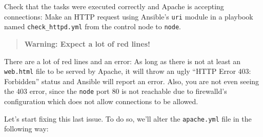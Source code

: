 Check that the tasks were executed correctly and Apache is accepting
connections: Make an HTTP request using Ansible's \texttt{uri} module in
a playbook named \texttt{check\_httpd.yml} from the control node to
\texttt{node}.

\begin{Shaded}
\begin{Highlighting}[]
\PreprocessorTok{{-}{-}{-}}
\KeywordTok{{-}}\AttributeTok{ }\KeywordTok{:}
\AttributeTok{  }\KeywordTok{:}
\AttributeTok{  }\KeywordTok{:}
\AttributeTok{    }\KeywordTok{:}\AttributeTok{ }
\AttributeTok{  }\KeywordTok{:}
\AttributeTok{    }\KeywordTok{{-}}\AttributeTok{ }\KeywordTok{:}
\AttributeTok{      }\KeywordTok{:}
\AttributeTok{        }\KeywordTok{:}\AttributeTok{ }
\end{Highlighting}
\end{Shaded}

\begin{quote}
\textbf{Warning: Expect a lot of red lines!}
\end{quote}

\begin{Shaded}
\begin{Highlighting}[]
\ExtensionTok{[student@controller}\NormalTok{ \textasciitilde{}]$ ansible{-}navigator run check\_httpd.yml }
\end{Highlighting}
\end{Shaded}

There are a lot of red lines and an error: As long as there is not at
least an \texttt{web.html} file to be served by Apache, it will throw an
ugly ``HTTP Error 403: Forbidden'' status and Ansible will report an
error.
Also, you are not even seeing the 403 error, since the \texttt{node} port 80 is not reachable due to firewalld's configuration which does not allow connections to be allowed.

Let's start fixing this last issue. To do so, we'll alter the \texttt{apache.yml} file in the following way:

